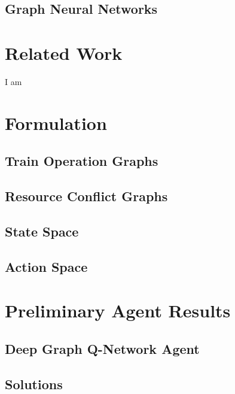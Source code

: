 \documentclass[runningheads]{llncs}
\begin{document}
\subsection{Graph Neural Networks}
\label{sss:gnn}

\section{Related Work}
\label{sse:related_work}
I am \cite{gnndrl:Devailly_2022}
\section{Formulation}
\label{sse:formulation}

\subsection{Train Operation Graphs}
\label{sss:train_ops}


\subsection{Resource Conflict Graphs}
\label{sss:resource_conflicts}


\subsection{State Space}
\label{sss:state_space}

\subsection{Action Space}
\label{sss:action_space}

\section{Preliminary Agent Results}
\label{sse:results}

\subsection{Deep Graph Q-Network Agent}
\label{sss:agent}


\subsection{Solutions}
\label{sss:solutions}
\end{document}
